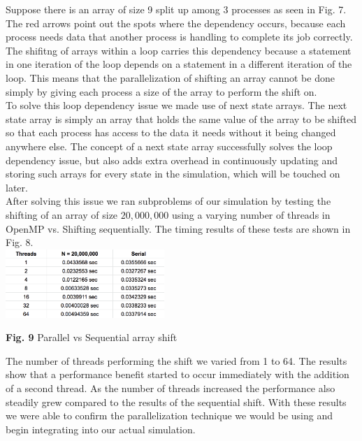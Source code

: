 \documentclass[conference]{IEEEtran}
\begin{document}
Suppose there is an array of size 9 split up among 3 processes as seen in Fig. 7. The red arrows point out the spots where the dependency occurs, because each process needs data that another process is handling to complete its job correctly. The shifitng of arrays within a loop carries this dependency because a statement in one iteration of the loop depends on a statement in a different iteration of the loop. This means that the parallelization of shifting an array cannot be done simply by giving each process a size of the array to perform the shift on.  \\

\hspace*{.2cm} To solve this loop dependency issue we made use of next state arrays. The next state array is simply an array that holds the same value of the array to be shifted so that each process has access to the data it needs without it being changed anywhere else. The concept of a next state array successfully solves the loop dependency issue, but also adds extra overhead in continuously updating and storing such arrays for every state in the simulation, which will be touched on later. \\

\hspace*{.2cm} After solving this issue we ran subproblems of our simulation by testing the shifting of an array of size $20,000,000$ using a varying number of threads in OpenMP vs. Shifting sequentially. The timing results of these tests are shown in Fig. 8. \\

\includegraphics[width=0.45\textwidth]{subtest}
\begin{center}
	\textbf{Fig. 9} Parallel vs Sequential array shift \\
\end{center}

The number of threads performing the shift we varied from 1 to 64. The results show that a performance benefit started to occur immediately with the addition of a second thread. As the number of threads increased the performance also steadily grew compared to the results of the sequential shift. With these results we were able to confirm the parallelization technique we would be using and begin integrating into our actual simulation. \\
\end{document}
